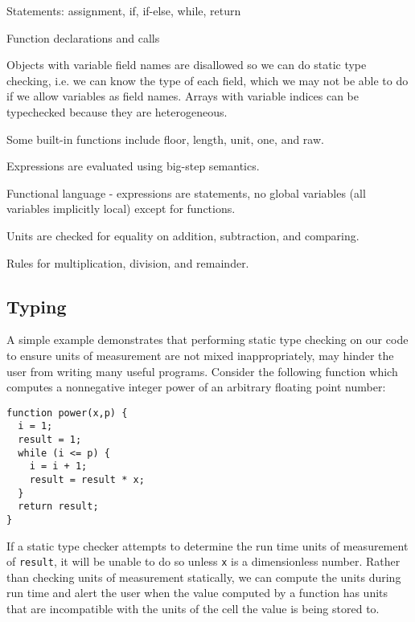 \documentclass{acm_proc_article-sp}
\begin{document}
Statements: assignment, if, if-else, while, return

Function declarations and calls

Objects with variable field names are disallowed so we can do static
type checking, i.e. we can know the type of each field, which we may
not be able to do if we allow variables as field names. Arrays with
variable indices can be typechecked because they are heterogeneous.

Some built-in functions include floor, length, unit, one, and raw.

Expressions are evaluated using big-step semantics.

Functional language - expressions are statements, no global variables
(all variables implicitly local) except for functions.

Units are checked for equality on addition, subtraction, and comparing.

Rules for multiplication, division, and remainder.

\subsection{Typing}
A simple example demonstrates that performing static type checking on
our code to ensure units of measurement are not mixed inappropriately,
may hinder the user from writing many useful programs. Consider the
following function which computes a nonnegative integer power of an
arbitrary floating point number:

\verb#function power(x,p) {# \\
\verb#  i = 1;# \\
\verb#  result = 1;# \\
\verb#  while (i <= p) {# \\
\verb#    i = i + 1;# \\
\verb#    result = result * x;# \\
\verb#  }# \\
\verb#  return result;# \\
\verb#}#
\vspace{0.125in}

If a static type checker attempts to determine the run time units of
measurement of \texttt{result}, it will be unable to do so unless
\texttt{x} is a dimensionless number. Rather than checking units of
measurement statically, we can compute the units during run time and
alert the user when the value computed by a function has units that
are incompatible with the units of the cell the value is being stored
to.
\end{document}
